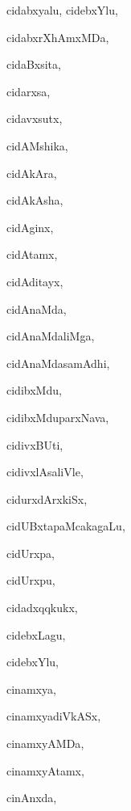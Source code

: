 \begin{multicols}{3}
{\noindent
{cidabxyalu, cidebxYlu}, \pageref{cidabxyalu, cidebxYlu}

\noindent
{cidabxrXhAmxMDa}, \pageref{cidabxrXhAmxMDa}

\noindent
{cidaBxsita}, \pageref{cidaBxsita}

\noindent
{cidarxsa}, \pageref{cidarxsa}

\noindent
{cidavxsutx}, \pageref{cidavxsutx}

\noindent
{cidAMshika}, \pageref{cidAMshika}

\noindent
{cidAkAra}, \pageref{cidAkAra}

\noindent
{cidAkAsha}, \pageref{cidAkAsha}

\noindent
{cidAginx}, \pageref{cidAginx}

\noindent
{cidAtamx}, \pageref{cidAtamx}

\noindent
{cidAditayx}, \pageref{cidAditayx}

\noindent
{cidAnaMda}, \pageref{cidAnaMda}

\noindent
{cidAnaMdaliMga}, \pageref{cidAnaMdaliMga}

\noindent
{cidAnaMdasamAdhi}, \pageref{cidAnaMdasamAdhi}

\noindent
{cidibxMdu}, \pageref{cidibxMdu}

\noindent
{cidibxMduparxNava}, \pageref{cidibxMduparxNava}

\noindent
{cidivxBUti}, \pageref{cidivxBUti}

\noindent
{cidivxlAsaliVle}, \pageref{cidivxlAsaliVle}

\noindent
{cidurxdArxkiSx}, \pageref{cidurxdArxkiSx}

\noindent
{cidUBxtapaMcakagaLu}, \pageref{cidUBxtapaMcakagaLu}

\noindent
{cidUrxpa}, \pageref{cidUrxpa}

\noindent
{cidUrxpu}, \pageref{cidUrxpu}

\noindent
{cidadxqqkukx}, \pageref{cidadxqqkukx}

\noindent
{cidebxLagu}, \pageref{cidebxLagu}

\noindent
{cidebxYlu}, \pageref{cidebxYlu}

\noindent
{cinamxya}, \pageref{cinamxya}

\noindent
{cinamxyadiVkASx}, \pageref{cinamxyadiVkASx}

\noindent
{cinamxyAMDa}, \pageref{cinamxyAMDa}

\noindent
{cinamxyAtamx}, \pageref{cinamxyAtamx}

\noindent
{cinAnxda}, \pageref{cinAnxda}

}
\end{multicols}
